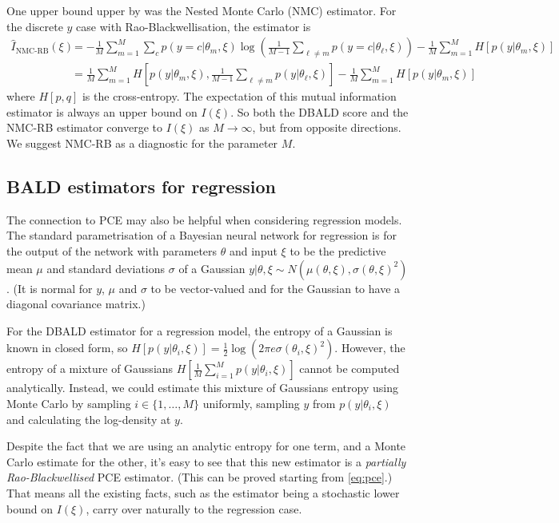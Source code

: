 \documentclass[a4paper, 10pt]{report}
\theoremstyle{plain}
\begin{document}
	One upper bound upper by \citet{foster2020unified} was the Nested Monte Carlo (NMC) \citep{vincent2017} estimator.
	For the discrete $y$ case with Rao-Blackwellisation, the estimator is 
	\begin{align}
	\hat{I}_\text{NMC-RB}(\xi) &= -\frac{1}{M} \sum_{m=1}^M \sum_c p(y=c|\theta_m,\xi) \log\left(\frac{1}{M-1} \sum_{\ell \ne m} p(y=c|\theta_\ell,\xi)  \right)  -\frac{1}{M} \sum_{m=1}^M H[p(y|\theta_m,\xi)]\\
	&= \frac{1}{M} \sum_{m=1}^M H\left[p(y|\theta_m,\xi), \frac{1}{M-1} \sum_{\ell \ne m} p(y|\theta_\ell,\xi)  \right]  -\frac{1}{M} \sum_{m=1}^M H[p(y|\theta_m,\xi)]
	\end{align}
	where $H[p,q]$ is the cross-entropy.
	The expectation of this mutual information estimator is always an upper bound on $I(\xi)$.
	So both the DBALD score and the NMC-RB estimator converge to $I(\xi)$ as $M\to\infty$, but from opposite directions.
	We suggest NMC-RB as a diagnostic for the parameter $M$.
	
	
	\subsection{BALD estimators for regression}
	The connection to PCE may also be helpful when considering regression models.
	The standard parametrisation of a Bayesian neural network for regression is for the output of the network with parameters $\theta$ and input $\xi$ to be the predictive mean ${\mu}$ and standard deviations ${\sigma}$ of a Gaussian $y|\theta,\xi \sim N({\mu}(\theta,\xi), {\sigma}(\theta,\xi)^2)$. (It is normal for $y$, $\mu$ and $\sigma$ to be vector-valued and for the Gaussian to have a diagonal covariance matrix.)
	
	For the DBALD estimator for a regression model, the entropy of a Gaussian is known in closed form, so $H[p(y|\theta_i,\xi)] = \tfrac{1}{2}\log\left(2\pi e \sigma(\theta_i,\xi)^2 \right)$.
	However, the entropy of a mixture of Gaussians $H\left[ \frac{1}{M}\sum_{i=1}^M p(y|\theta_i,\xi) \right]$ cannot be computed analytically.
	Instead, we could estimate this mixture of Gaussians entropy using Monte Carlo by sampling $i\in \{1,\dots,M\}$ uniformly, sampling $y$ from $p(y|\theta_i,\xi)$ and calculating the log-density at $y$.
	
	Despite the fact that we are using an analytic entropy for one term, and a Monte Carlo estimate for the other, it's easy to see that this new estimator is a \emph{partially Rao-Blackwellised} PCE estimator. (This can be proved starting from \eqref{eq:pce}.)
	That means all the existing facts, such as the estimator being a stochastic lower bound on $I(\xi)$, carry over naturally to the regression case.
	
\end{document}
